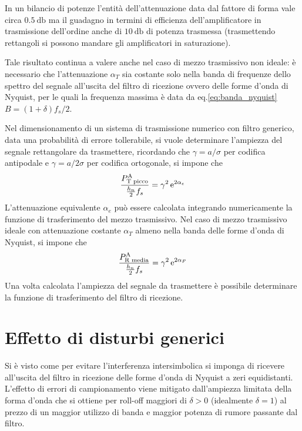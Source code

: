 In un bilancio di potenze l'entità dell'attenuazione data dal fattore di forma vale circa $\SI{0.5}{\decibel}$ ma il guadagno in termini di efficienza dell'amplificatore in trasmissione dell'ordine anche di $\SI{10}{\decibel}$ di potenza trasmessa (trasmettendo rettangoli si possono mandare gli amplificatori in saturazione).

Tale risultato continua a valere anche nel caso di mezzo trasmissivo non ideale: è necessario che l'attenuazione $\alpha_T$ sia costante solo nella banda di frequenze dello spettro del segnale all'uscita del filtro di ricezione ovvero delle forme d'onda di Nyquist, per le quali la frequenza massima è data da eq.\ref{eq:banda_nyquist} $B=(1+\delta)f_s/2$.

Nel dimensionamento di un sistema di trasmissione numerico con filtro generico, data una probabilità di errore tollerabile, si vuole determinare l'ampiezza del segnale rettangolare da trasmettere, ricordando che $\gamma=a/\sigma$ per codifica antipodale e $\gamma=a/2\sigma$ per codifica ortogonale, si impone che 
\begin{equation}
\frac{P_\text{T picco}^\text{A}}{\frac{h_n}{2}f_s}=\gamma^2\operatorname{e}^{2\alpha_e}
\end{equation}
L'attenuazione equivalente $\alpha_e$ può essere calcolata integrando numericamente la funzione di trasferimento del mezzo trasmissivo. Nel caso di mezzo trasmissivo ideale con attenuazione costante $\alpha_T$ almeno nella banda delle forme d'onda di Nyquist, si impone che 
\begin{equation}
\frac{P_\text{R media}^\text{A}}{\frac{h_n}{2}f_s}=\gamma^2\operatorname{e}^{2\alpha_F}
\end{equation}
Una volta calcolata l'ampiezza del segnale da trasmettere è possibile determinare la funzione di trasferimento del filtro di ricezione.

\section{Effetto di disturbi generici}
Si è visto come per evitare l'interferenza intersimbolica si imponga di ricevere all'uscita del filtro in ricezione delle forme d'onda di Nyquist a zeri equidistanti. L'effetto di errori di campionamento viene mitigato dall'ampiezza limitata della forma d'onda che si ottiene per roll-off maggiori di $\delta>0$ (idealmente $\delta=1$) al prezzo di un maggior utilizzo di banda e maggior potenza di rumore passante dal filtro.

